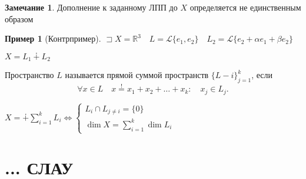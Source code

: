 \documentclass{book}
\newcommand\R{\ensuremath{\mathbb{R}}}
\newcommand{\ov}[2]{\overset{#1}{#2}}
\theoremstyle{definition}
\newtheorem*{note}{Замечание}
\newtheorem*{example}{Пример}
\begin{document}
\begin{note}
    Дополнение к заданному ЛПП до $X$ определяется не единственным образом
\end{note}
\begin{example}
    [Контрпример]

    $\sqsupset X = \R^3\quad L = \mathscr{L}\{e_1, e_2\}\quad L_2 = \mathscr{L}\{e_2+\alpha e_1+\beta e_2\}$

    $X = L_1\dotplus L_2$
\end{example}
\begin{definition}
    Пространство $L$ называется прямой суммой пространств $\{L-i\}_{j=1}^k$, если \[
        \forall x\in L\quad x \ov{!}= x_1+x_2+\ldots+x_k:\quad x_j\in L_j
    .\] 
\end{definition}
\begin{theorem}
    $X = \dotplus \sum_{i=1}^{k} L_i \iff \begin{cases}
        L_i\cap L_{j\neq i} = \{0\}\\
        \dim X = \sum_{i=1}^{k} \dim L_i
    \end{cases}$
\end{theorem}



\section{... СЛАУ}
\end{document}
